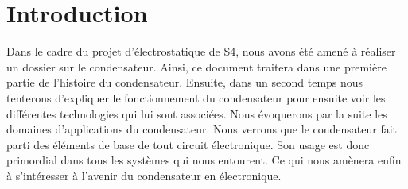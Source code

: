 \chapter{Introduction} 
Dans le cadre du projet d'électrostatique de S4, nous avons été amené à réaliser un dossier sur le condensateur. Ainsi, ce document traitera dans une première partie de l'histoire du condensateur. Ensuite, dans un second temps nous tenterons d'expliquer le fonctionnement du condensateur pour ensuite voir les différentes technologies qui lui sont associées. Nous évoquerons par la suite les domaines d'applications du condensateur. Nous verrons que le condensateur fait parti des éléments de base de tout circuit électronique. Son usage est donc primordial dans tous les systèmes qui nous entourent. Ce qui nous amènera enfin à s'intéresser à l'avenir du condensateur en électronique.
